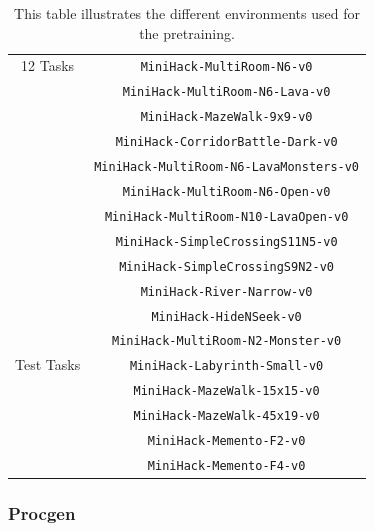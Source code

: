 \begin{table}[!ht]
\begin{tabular}{c c }
12 Tasks & \texttt{MiniHack-MultiRoom-N6-v0}\\
        & \texttt{MiniHack-MultiRoom-N6-Lava-v0} \\ 
        &  \texttt{MiniHack-MazeWalk-9x9-v0}\\
        &\texttt{MiniHack-CorridorBattle-Dark-v0}\\
        &  \texttt{MiniHack-MultiRoom-N6-LavaMonsters-v0}\\
        &\texttt{MiniHack-MultiRoom-N6-Open-v0} \\
        &  \texttt{MiniHack-MultiRoom-N10-LavaOpen-v0} \\
        &\texttt{MiniHack-SimpleCrossingS11N5-v0} \\
        &  \texttt{MiniHack-SimpleCrossingS9N2-v0} \\
        &\texttt{MiniHack-River-Narrow-v0} \\
        &  \texttt{MiniHack-HideNSeek-v0} \\
        &\texttt{MiniHack-MultiRoom-N2-Monster-v0} \\
\hline
Test Tasks & \texttt{MiniHack-Labyrinth-Small-v0} \\
            & \texttt{MiniHack-MazeWalk-15x15-v0} \\
            & \texttt{MiniHack-MazeWalk-45x19-v0} \\
            & \texttt{MiniHack-Memento-F2-v0} \\
            & \texttt{MiniHack-Memento-F4-v0} \\
\hline
\end{tabular}

\caption{ This table illustrates the different environments used for the pretraining. }

\label{tab:minihack_env_details}
\end{table}

\subsubsection{Procgen}

